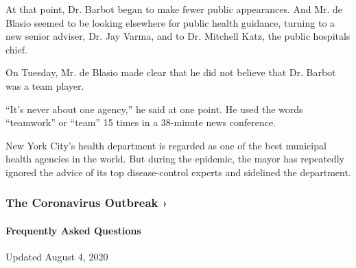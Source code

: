 At that point, Dr. Barbot began to make fewer public appearances. And
Mr. de Blasio seemed to be looking elsewhere for public health guidance,
turning to a new senior adviser, Dr. Jay Varma, and to Dr. Mitchell
Katz, the public hospitals chief.

On Tuesday, Mr. de Blasio made clear that he did not believe that Dr.
Barbot was a team player.

``It's never about one agency,'' he said at one point. He used the words
``teamwork'' or ``team'' 15 times in a 38-minute news conference.

New York City's health department is regarded as one of the best
municipal health agencies in the world. But during the epidemic, the
mayor has repeatedly ignored the advice of its top disease-control
experts and sidelined the department.

\href{https://www.nytimes.com/news-event/coronavirus?action=click\&pgtype=Article\&state=default\&region=MAIN_CONTENT_3\&context=storylines_faq}{}

\hypertarget{the-coronavirus-outbreak-}{%
\subsubsection{The Coronavirus Outbreak
›}\label{the-coronavirus-outbreak-}}

\hypertarget{frequently-asked-questions}{%
\paragraph{Frequently Asked
Questions}\label{frequently-asked-questions}}

Updated August 4, 2020

